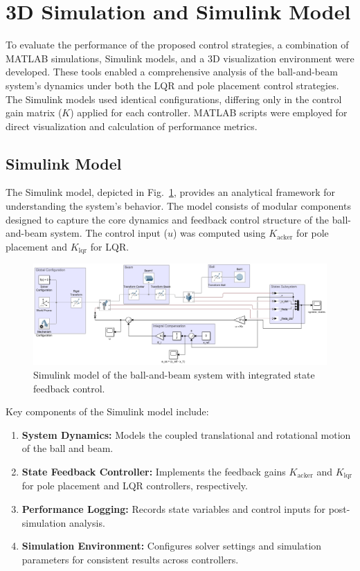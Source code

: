 \documentclass[conference]{IEEEtran}
\begin{document}
\section{3D Simulation and Simulink Model}
\label{sec:simulation_model}

To evaluate the performance of the proposed control strategies, a combination of MATLAB simulations, Simulink models, and a 3D visualization environment were developed\cite{ball_beam_simulink}. These tools enabled a comprehensive analysis of the ball-and-beam system's dynamics under both the LQR and pole placement control strategies. The Simulink models used identical configurations, differing only in the control gain matrix (\(K\)) applied for each controller. MATLAB scripts were employed for direct visualization and calculation of performance metrics.

\subsection{Simulink Model}
\label{subsec:simulink_model}

The Simulink model, depicted in Fig.~\ref{fig:simulink_model}, provides an analytical framework for understanding the system's behavior. The model consists of modular components designed to capture the core dynamics and feedback control structure of the ball-and-beam system. The control input (\(u\)) was computed using \(K_{\text{acker}}\) for pole placement and \(K_{\text{lqr}}\) for LQR.

\begin{figure}[H]
    \centering
    \includegraphics[width=\linewidth]{figures/simulink_model.png}
    \caption{Simulink model of the ball-and-beam system with integrated state feedback control.}
    \label{fig:simulink_model}
\end{figure}

Key components of the Simulink model include:
\begin{enumerate}
    \item \textbf{System Dynamics:} Models the coupled translational and rotational motion of the ball and beam.
    \item \textbf{State Feedback Controller:} Implements the feedback gains \(K_{\text{acker}}\) and \(K_{\text{lqr}}\) for pole placement and LQR controllers, respectively.
    \item \textbf{Performance Logging:} Records state variables and control inputs for post-simulation analysis.
    \item \textbf{Simulation Environment:} Configures solver settings and simulation parameters for consistent results across controllers.
\end{enumerate}
\end{document}
